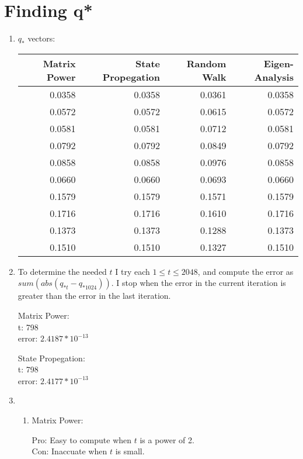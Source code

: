 \documentclass[12pt]{article}
\begin{document}
\raggedright%

\newcommand\NAME{Elliot Hatch}
\newcommand\UID{u0790511}
\newcommand\HWNUM{6}

\section{Finding q*}

\begin{enumerate}
	\item

		$q_*$ vectors:

		\begin{tabular}{r | r | r | r}
			Matrix Power & State Propegation & Random Walk & Eigen-Analysis \\
			\hline
			0.0358 & 0.0358 & 0.0361 & 0.0358 \\
			0.0572 & 0.0572 & 0.0615 & 0.0572 \\
			0.0581 & 0.0581 & 0.0712 & 0.0581 \\
			0.0792 & 0.0792 & 0.0849 & 0.0792 \\
			0.0858 & 0.0858 & 0.0976 & 0.0858 \\
			0.0660 & 0.0660 & 0.0693 & 0.0660 \\
			0.1579 & 0.1579 & 0.1571 & 0.1579 \\
			0.1716 & 0.1716 & 0.1610 & 0.1716 \\
			0.1373 & 0.1373 & 0.1288 & 0.1373 \\
			0.1510 & 0.1510 & 0.1327 & 0.1510 \\
		\end{tabular}

	\item 
		To determine the needed $t$ I try each $1\leq t \leq 2048$, and compute the error as $sum(abs(q_{*t}-q_{*1024}))$. I stop when the error in the current iteration is greater than the error in the last iteration.

	Matrix Power:\\
	t: 798\\
	error: $2.4187*10^{-13}$

	State Propegation:\\
	t: 798\\
	error: $2.4177*10^{-13}$

	\item

		\begin{enumerate}
			\item Matrix Power:

				Pro: Easy to compute when $t$ is a power of 2.\\
				Con: Inaccuate when $t$ is small.\\


\end{enumerate}
\end{enumerate}
\end{document}
